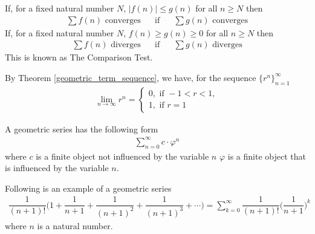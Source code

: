 \begin{theorem}
If, for a fixed natural number $N$, $\lvert f(n) \rvert \leq g(n)$ for all $n \geq N$ then
\begin{align*}
    \sum f(n) \hspace{4pt} \text{converges} \hspace{20pt} \text{if} \hspace{20pt} \sum g(n) \hspace{4pt} \text{converges}
\end{align*}
If, for a fixed natural number $N$, $f(n) \geq g(n) \geq 0$ for all $n \geq N$ then
\begin{align*}
    \sum f(n) \hspace{4pt} \text{diverges} \hspace{20pt} \text{if} \hspace{20pt} \sum g(n) \hspace{4pt} \text{diverges}
\end{align*}
This is known as The Comparison Test.
\end{theorem}

\begin{recall}
By Theorem \ref{geometric_term_sequence}, we have, for the sequence $\{r^{n}\}_{n=1}^{\infty}$
\begin{align*}
    \lim_{n \longrightarrow \infty} r^{n} = \begin{cases}
    0, \hspace{4pt} \text{if} \hspace{4pt} -1 < r < 1,\\[2ex]
    1, \hspace{4pt} \text{if} \hspace{4pt} r = 1
    \end{cases}
\end{align*}
\end{recall}

\begin{definition}
A geometric series has the following form
\begin{align*}
    \sum_{n = 0}^{\infty} c \cdot \varphi^{n}
\end{align*}
where $c$ is a finite object not influenced by the variable $n$ $\varphi$ is a finite object that is influenced by the variable $n$. 
\end{definition}

\begin{example}
Following is an example of a geometric series
\begin{align*}
    \dfrac{1}{(n+1)!} \Big( 1 + \dfrac{1}{n+1} + \dfrac{1}{(n+1)^{2}} + \dfrac{1}{(n+1)^{3}} + \cdots \Big) = \sum_{k = 0}^{\infty} \dfrac{1}{(n+1)!} \Big( \dfrac{1}{n+1} \Big)^{k}
\end{align*}
where $n$ is a natural number.
\end{example}

